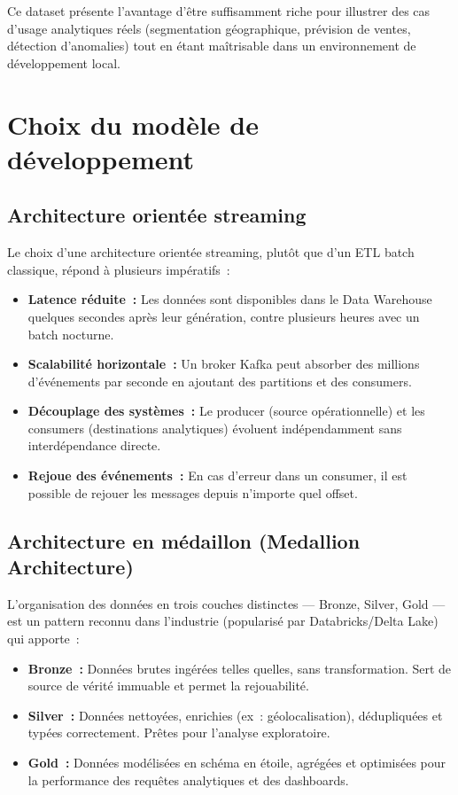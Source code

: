 Ce dataset présente l'avantage d'être suffisamment riche pour illustrer des cas d'usage analytiques réels (segmentation géographique, prévision de ventes, détection d'anomalies) tout en étant maîtrisable dans un environnement de développement local.

\section{Choix du modèle de développement}

\subsection{Architecture orientée streaming}

Le choix d'une architecture orientée streaming, plutôt que d'un ETL batch classique, répond à plusieurs impératifs~:

\begin{itemize}
  \setlength{\itemsep}{0.4em}
  \item \textbf{Latence réduite~:} Les données sont disponibles dans le Data Warehouse quelques secondes après leur génération, contre plusieurs heures avec un batch nocturne.
  \item \textbf{Scalabilité horizontale~:} Un broker Kafka peut absorber des millions d'événements par seconde en ajoutant des partitions et des consumers.
  \item \textbf{Découplage des systèmes~:} Le producer (source opérationnelle) et les consumers (destinations analytiques) évoluent indépendamment sans interdépendance directe.
  \item \textbf{Rejoue des événements~:} En cas d'erreur dans un consumer, il est possible de rejouer les messages depuis n'importe quel offset.
\end{itemize}

\subsection{Architecture en médaillon (Medallion Architecture)}

L'organisation des données en trois couches distinctes — Bronze, Silver, Gold — est un pattern reconnu dans l'industrie (popularisé par Databricks/Delta Lake) qui apporte~:

\begin{itemize}
  \setlength{\itemsep}{0.4em}
  \item \textbf{Bronze~:} Données brutes ingérées telles quelles, sans transformation. Sert de source de vérité immuable et permet la rejouabilité.
  \item \textbf{Silver~:} Données nettoyées, enrichies (ex~: géolocalisation), dédupliquées et typées correctement. Prêtes pour l'analyse exploratoire.
  \item \textbf{Gold~:} Données modélisées en schéma en étoile, agrégées et optimisées pour la performance des requêtes analytiques et des dashboards.
\end{itemize}

